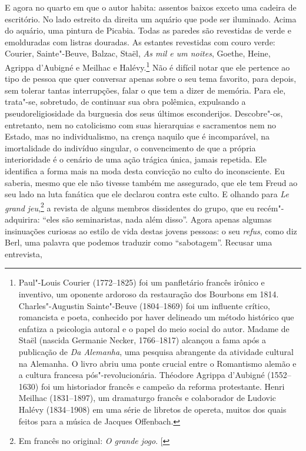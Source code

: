 E agora no quarto em que o autor habita: assentos baixos exceto uma
cadeira de escritório. No lado estreito da direita um aquário que pode
ser iluminado. Acima do aquário, uma pintura de Picabia. Todas as paredes
são revestidas de verde e emolduradas com listras douradas. As estantes
revestidas com couro verde: Courier, Sainte"-Beuve, Balzac, Staël,
\emph{As mil e um noites}, Goethe, Heine, Agrippa d'Aubigné e Meilhac e
Halévy.\footnote{Paul"-Louis Courier (1772--1825) foi um panfletário
  francês irônico e inventivo, um oponente ardoroso da
  restauração dos Bourbons em 1814. Charles"-Augustin Sainte"-Beuve
  (1804--1869) foi um influente crítico, romancista e poeta, conhecido
  por haver delineado um método histórico que enfatiza a psicologia
  autoral e o papel do meio social do autor. Madame de Staël (nascida
  Germanie Necker, 1766--1817) alcançou a fama após a publicação de
  \emph{Da Alemanha}, uma pesquisa abrangente da atividade cultural
  na Alemanha. O livro abriu uma ponte crucial entre o Romantismo alemão
  e a cultura francesa pós"-revolucionária. Théodore Agrippa d'Aubigné
  (1552--1630) foi um historiador francês e campeão da reforma
  protestante. Henri Meilhac (1831--1897), um dramaturgo francês e
  colaborador de Ludovic Halévy (1834--1908) em uma série de libretos de
  opereta, muitos dos quais feitos para a música de Jacques Offenbach. \versal{[N.~O.]}}
Não é difícil notar que ele pertence ao tipo de pessoa que quer conversar apenas sobre o seu tema favorito, para depois, sem tolerar tantas interrupções, falar o que tem a dizer de memória. Para
ele, trata"-se, sobretudo, de continuar sua obra polêmica, expulsando a
pseudoreligiosidade da burguesia dos seus últimos esconderijos.
Descobre"-os, entretanto, nem no catolicismo com suas hierarquias e
sacramentos nem no Estado, mas no individualismo, na crença naquilo que
é incomparável, na imortalidade do indivíduo singular, o convencimento
de que a própria interioridade é o cenário de uma ação trágica única,
jamais repetida. Ele identifica a forma mais na moda desta convicção no
culto do inconsciente. Eu saberia, mesmo que ele não tivesse também me assegurado, que ele tem Freud ao seu lado na luta fanática que ele declarou contra este culto. E olhando para \emph{Le grand jeu},\footnote{Em francês no original: \emph{O grande jogo}. {[}\versal{N.~T.}{]}} a revista de
alguns membros dissidentes do grupo, que eu recém"-adquirira: ``eles são
seminaristas, nada além disso''. Agora apenas algumas insinuações
curiosas ao estilo de vida destas jovens pessoas: o seu \emph{refus},
como diz Berl, uma palavra que podemos traduzir como ``sabotagem''. Recusar uma entrevista,
